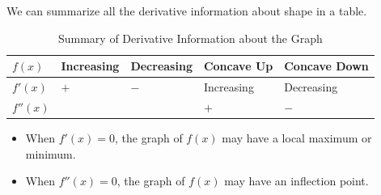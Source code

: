We can summarize all the derivative information about shape in a table.
\begin{theorem}
\begin{table}[!ht]
    \centering
    \begin{tabular}{lllll}
    \toprule    
    $f(x)$      & Increasing	& Decreasing	& Concave Up	& Concave Down	\\
    \midrule
    $f'(x)$     & $+$	        & $-$	        & Increasing	& Decreasing	\\
    \midrule
    $f''(x)$	&               & 	            & $+$	        & $-$\\
    \bottomrule
    \end{tabular}
    \caption{Summary of Derivative Information about the Graph}
    \label{tab:3-5-analysis}
\end{table}
\begin{itemize}[label={}]
    \item When $f'(x)=0$, the graph of $f(x)$ may have a local maximum or minimum.
    \item When $f''(x)=0$, the graph of $f(x)$ may have an inflection point.
\end{itemize}
\end{theorem}

